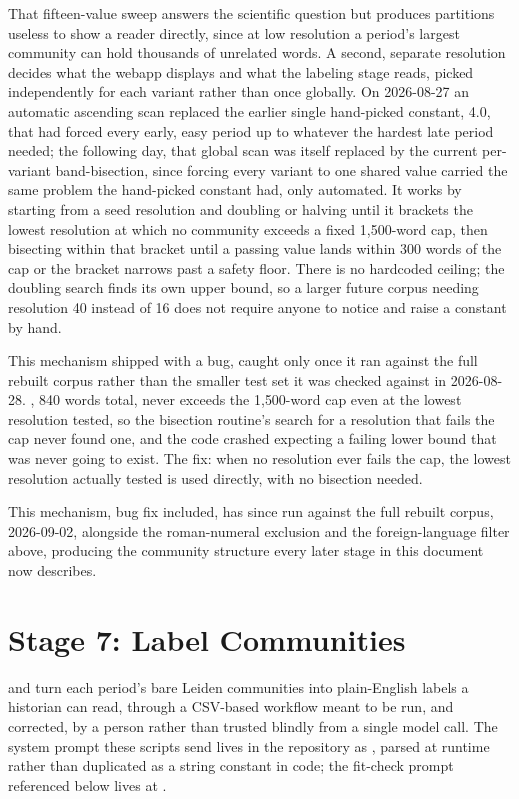 \documentclass[11pt]{article}
\begin{document}
That fifteen-value sweep answers the scientific question but produces
partitions useless to show a reader directly, since at low resolution a
period's largest community can hold thousands of unrelated words. A
second, separate resolution decides what the webapp displays and what
the labeling stage reads, picked independently for each variant rather
than once globally. On 2026-08-27 an automatic ascending scan replaced
the earlier single hand-picked constant, 4.0, that had forced every
early, easy period up to whatever the hardest late period needed; the
following day, that global scan was itself replaced by the current
per-variant band-bisection, since forcing every variant to one shared
value carried the same problem the hand-picked constant had, only
automated. It works by starting from a seed resolution and doubling or
halving until it brackets the lowest resolution at which no community
exceeds a fixed 1{,}500-word cap, then bisecting within that bracket
until a passing value lands within 300 words of the cap or the bracket
narrows past a safety floor. There is no hardcoded ceiling; the doubling
search finds its own upper bound, so a larger future corpus needing
resolution 40 instead of 16 does not require anyone to notice and raise
a constant by hand.

This mechanism shipped with a bug, caught only once it ran against the
full rebuilt corpus rather than the smaller test set it was checked
against in 2026-08-28. , 840 words total,
never exceeds the 1{,}500-word cap even at the lowest resolution tested,
so the bisection routine's search for a resolution that fails the cap
never found one, and the code crashed expecting a failing lower bound
that was never going to exist. The fix: when no resolution ever fails
the cap, the lowest resolution actually tested is used directly, with no
bisection needed.

This mechanism, bug fix included, has since run against the full
rebuilt corpus, 2026-09-02, alongside the roman-numeral exclusion and the
foreign-language filter above, producing the community structure every
later stage in this document now describes.

\section{Stage 7: Label Communities}
\label{sec:labeling}

 and
 turn each period's bare Leiden
communities into plain-English labels a historian can read, through a
CSV-based workflow meant to be run, and corrected, by a person rather
than trusted blindly from a single model call. The system prompt these
scripts send lives in the repository as
, parsed at runtime
rather than duplicated as a string constant in code; the fit-check
prompt referenced below lives at
.
\end{document}
